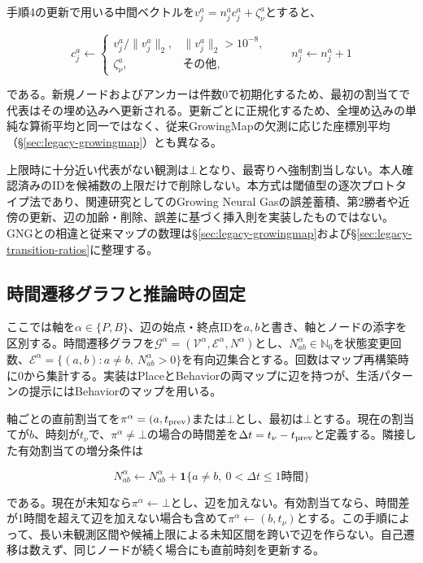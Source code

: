手順4の更新で用いる中間ベクトルを\(v_j^a=n_j^ac_j^a+\zeta_\nu^a\)とすると、

\[
c_j^a\leftarrow
\begin{cases}
v_j^a/\lVert v_j^a\rVert_2,&\lVert v_j^a\rVert_2>10^{-8},\\
\zeta_\nu^a,&\text{その他},
\end{cases}
\qquad n_j^a\leftarrow n_j^a+1
\]

である。新規ノードおよびアンカーは件数0で初期化するため、最初の割当てで代表はその埋め込みへ更新される。更新ごとに正規化するため、全埋め込みの単純な算術平均と同一ではなく、従来GrowingMapの欠測に応じた座標別平均（§\ref{sec:legacy-growingmap}）とも異なる。

上限時に十分近い代表がない観測は\(\bot\)となり、最寄りへ強制割当しない。本人確認済みのIDを候補数の上限だけで削除しない。本方式は閾値型の逐次プロトタイプ法であり、関連研究としてのGrowing Neural Gasの誤差蓄積、第2勝者や近傍の更新、辺の加齢・削除、誤差に基づく挿入則を実装したものではない。GNGとの相違と従来マップの数理は§\ref{sec:legacy-growingmap}および§\ref{sec:legacy-transition-ratios}に整理する。

\subsection{時間遷移グラフと推論時の固定}
\label{sec:transition-graph}

ここでは軸を\(\alpha\in\{P,B\}\)、辺の始点・終点IDを\(a,b\)と書き、軸とノードの添字を区別する。時間遷移グラフを\(\mathcal G^\alpha=(\mathcal V^\alpha,\mathcal E^\alpha,N^\alpha)\)とし、\(N_{ab}^\alpha\in\mathbb N_0\)を状態変更回数、\(\mathcal E^\alpha=\{(a,b):a\ne b,\ N_{ab}^\alpha>0\}\)を有向辺集合とする。回数はマップ再構築時に0から集計する。実装はPlaceとBehaviorの両マップに辺を持つが、生活パターンの提示にはBehaviorのマップを用いる。

軸ごとの直前割当てを\(\pi^\alpha=(a,t_{\rm prev})\)または\(\bot\)とし、最初は\(\bot\)とする。現在の割当てが\(b\)、時刻が\(t_\nu\)で、\(\pi^\alpha\ne\bot\)の場合の時間差を\(\Delta t=t_\nu-t_{\rm prev}\)と定義する。隣接した有効割当ての増分条件は

\[
N_{ab}^{\alpha}\leftarrow N_{ab}^{\alpha}
+\mathbf1\{a\ne b,\ 0<\Delta t\le1\text{時間}\}
\]

である。現在が未知なら\(\pi^\alpha\leftarrow\bot\)とし、辺を加えない。有効割当てなら、時間差が1時間を超えて辺を加えない場合も含めて\(\pi^\alpha\leftarrow(b,t_\nu)\)とする。この手順によって、長い未観測区間や候補上限による未知区間を跨いで辺を作らない。自己遷移は数えず、同じノードが続く場合にも直前時刻を更新する。

